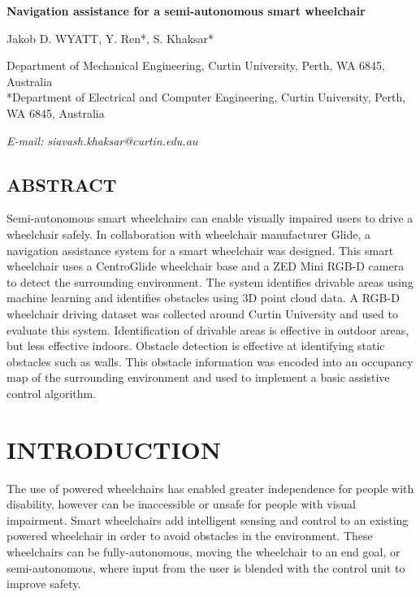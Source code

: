 \documentclass[10pt,twoside]{article}
\begin{document}
\begin{center}
\fontsize{12}{14.4}\selectfont
\textbf{Navigation assistance for a semi-autonomous smart wheelchair}
\fontsize{11}{13.2}\selectfont

\vspace{11pt}

Jakob D. WYATT, Y. Ren*, S. Khaksar*

\vspace{11pt}

Department of Mechanical Engineering, Curtin University, Perth, WA 6845, Australia\\
*Department of Electrical and Computer Engineering, Curtin University, Perth, WA 6845, Australia

\vspace{11pt}

\end{center}
\begin{flushright}
\textit{E-mail: siavash.khaksar@curtin.edu.au}
\end{flushright}

\begin{adjustwidth}{10mm}{10mm}
\section*{\textbf{ABSTRACT}}
Semi-autonomous smart wheelchairs can enable visually impaired users to drive a wheelchair
safely. In collaboration with wheelchair manufacturer Glide, a navigation assistance system for a
smart wheelchair was designed. This smart wheelchair uses a CentroGlide wheelchair
base and a ZED Mini RGB-D camera to detect the surrounding environment.
The system identifies drivable areas using machine learning
and identifies obstacles using 3D point cloud data. A RGB-D wheelchair driving dataset was
collected around Curtin University and used to evaluate this system. Identification of drivable
areas is effective in outdoor areas, but less effective indoors. Obstacle detection
is effective at identifying static obstacles such as walls. This obstacle information
was encoded into an occupancy map of the surrounding environment and used to
implement a basic assistive control algorithm.
\end{adjustwidth}

\section*{\textbf{INTRODUCTION}}
The use of powered wheelchairs has enabled greater independence for people with disability,
however can be inaccessible or unsafe for people with visual impairment.
Smart wheelchairs add intelligent sensing and control to an existing powered wheelchair
in order to avoid obstacles in the environment. These wheelchairs can be fully-autonomous, moving the wheelchair
to an end goal, or semi-autonomous, where input from the user is blended with the control unit to improve safety.
\end{document}
